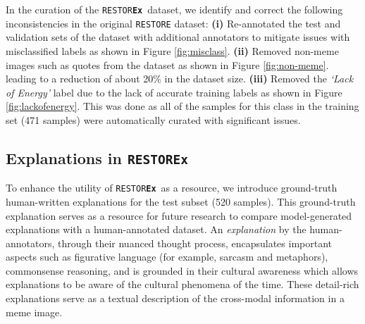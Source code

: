 \documentclass[letterpaper]{article} %
\newcommand{\dataset}{\texttt{RESTOR\textbf{Ex}}}
\begin{document}
In the curation of the \dataset\ dataset,
we identify and correct the following inconsistencies in the original \texttt{RESTORE} dataset:
\textbf{(i)} Re-annotated the test and validation sets of the dataset with additional annotators to mitigate issues with misclassified labels as shown in Figure \ref{fig:misclass}.
\textbf{(ii)} Removed non-meme images such as quotes from the %
 dataset as shown in Figure \ref{fig:non-meme}. leading to a reduction of about 20\% in the dataset size.
 \textbf{(iii)} Removed the \textit{`Lack of Energy'} label due to the lack of accurate training labels as shown in Figure \ref{fig:lackofenergy}. This was done as all of the samples for this class in the training set (471 samples) were automatically curated with significant issues.



\subsection{Explanations in \dataset}

To enhance the utility of \dataset\ as a resource, we introduce ground-truth human-written explanations for the test subset (520 samples). This ground-truth explanation serves as a resource for future research to compare model-generated explanations with a human-annotated dataset. 
An \textit{explanation} by the human-annotators, through their nuanced thought process, encapsulates important aspects such as figurative language (for example, sarcasm and metaphors), commonsense reasoning, and is grounded in their cultural awareness which allows explanations to be aware of the cultural phenomena of the time. These detail-rich explanations serve as a textual description of the cross-modal information in a meme image.
\end{document}

